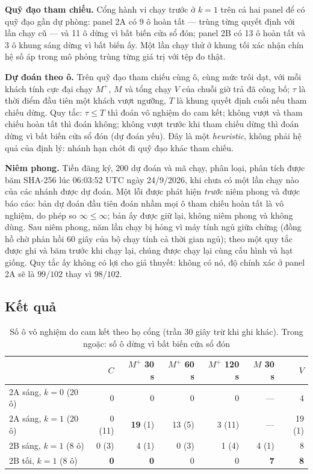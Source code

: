 \textbf{Quỹ đạo tham chiếu.} Cổng hành vi chạy trước ở $k = 1$ trên cả hai panel để có quỹ đạo gần
dự phòng: panel 2A có 9 ô hoàn tất --- trùng từng quyết định với lần chạy cũ --- và 11 ô dừng vì bất
biến cửa sổ đón; panel 2B có 13 ô hoàn tất và 3 ô khung sáng dừng vì bất biến ấy. Một lần chạy thử
ở khung tối xác nhận chín hệ số áp trong mô phỏng trùng từng giá trị với tệp đo thật.

\textbf{Dự đoán theo ô.} Trên quỹ đạo tham chiếu cùng ô, cùng mức trôi dạt, với mỗi khách tính cực
đại chạy $M^{+}$, $M$ và tổng chạy $V$ của chuỗi giờ trả đã công bố; $\tau$ là thời điểm đầu tiên một
khách vượt ngưỡng, $T$ là khung quyết định cuối nếu tham chiếu dừng. Quy tắc: $\tau \le T$ thì đoán
vô nghiệm do cam kết; không vượt và tham chiếu hoàn tất thì đoán không; không vượt trước khi tham
chiếu dừng thì đoán dừng vì bất biến cửa sổ đón (dự đoán yếu). Đây là một \emph{heuristic}, không
phải hệ quả của định lý: nhánh hạn chót đi quỹ đạo khác tham chiếu.

\textbf{Niêm phong.} Tiền đăng ký, 200 dự đoán và mã chạy, phân loại, phân tích được băm SHA-256 lúc
06:03:52 UTC ngày 24/9/2026, khi chưa có một lần chạy nào của các nhánh được dự đoán. Một lỗi được
phát hiện \emph{trước} niêm phong và được báo cáo: bản dự đoán đầu tiên đoán nhầm mọi ô tham chiếu
hoàn tất là vô nghiệm, do phép so $\infty \le \infty$; bản ấy được giữ lại, không niêm phong và không
dùng. Sau niêm phong, năm lần chạy bị hỏng vì máy tính ngủ giữa chừng (đồng hồ chờ phản hồi 60 giây
của bộ chạy tính cả thời gian ngủ); theo một quy tắc được ghi và băm trước khi chạy lại, chúng được
chạy lại cùng cấu hình và hạt giống. Quy tắc ấy không có lợi cho giả thuyết: không có nó, độ chính
xác ở panel 2A sẽ là $99/102$ thay vì $98/102$.

\subsection{Kết quả}

\begin{table}[htbp]
\centering
\caption{Số ô vô nghiệm do cam kết theo họ cổng (trần 30 giây trừ khi ghi khác). Trong ngoặc: số ô
dừng vì bất biến cửa sổ đón}
\label{bang:tang2-dem}
\small
\begin{tabular}{@{}lrrrrrr@{}}
\toprule
& $C$ & $M^{+}$ 30 s & $M^{+}$ 60 s & $M^{+}$ 120 s & $M$ 30 s & $V$\\
\midrule
2A sáng, $k=0$ (20 ô) & 0 & 0 & 0 & 0 & --- & 4\\
2A sáng, $k=1$ (20 ô) & 0 (11) & \textbf{19} (1) & 13 (5) & 3 (11) & --- & 19 (1)\\
\midrule
2B sáng, $k=1$ (8 ô) & 0 (3) & 4 (1) & 0 (3) & 1 (4) & 4 (1) & 8\\
2B tối, $k=1$ (8 ô) & \textbf{0} & \textbf{0} & 0 & 0 & \textbf{7} & \textbf{8}\\
\bottomrule
\end{tabular}
\end{table}

